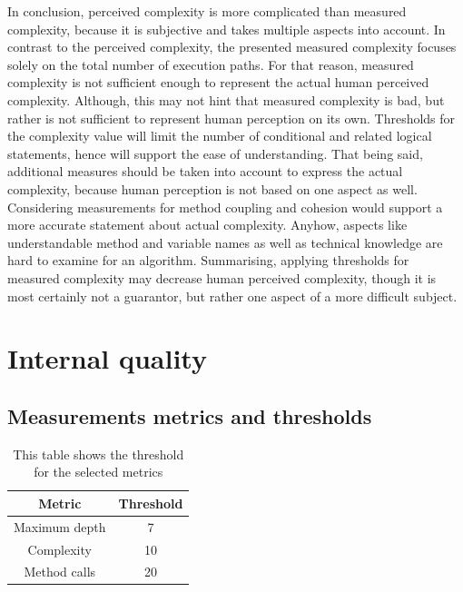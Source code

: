 \documentclass[conference]{IEEEtran}
\begin{document}
In conclusion, perceived complexity is more complicated than measured complexity, because it is subjective and takes multiple aspects into account. In contrast to the perceived complexity, the presented measured complexity focuses solely on the total number of execution paths. For that reason, measured complexity is not sufficient enough to represent the actual human perceived complexity. Although, this may not hint that measured complexity is bad, but rather is not sufficient to represent human perception on its own. Thresholds for the complexity value will limit the number of conditional and related logical statements, hence will support the ease of understanding. That being said, additional measures should be taken into account to express the actual complexity, because human perception is not based on one aspect as well. Considering measurements for method coupling and cohesion would support a more accurate statement about actual complexity. Anyhow, aspects like understandable method and variable names as well as technical knowledge are hard to examine for an algorithm. Summarising, applying thresholds for measured complexity may decrease human perceived complexity, though it is most certainly not a guarantor, but rather one aspect of a more difficult subject.

\section{Internal quality}

\subsection{Measurements metrics and thresholds}
\begin{table}
\centering
    \begin{tabular}{c c}
         Metric         & Threshold    \\ \hline
         Maximum depth  & 7             \\
         Complexity     & 10            \\
         Method calls   & 20            \\
    \end{tabular}
    \caption{This table shows the threshold for the selected metrics}
    \label{tbl:thresholds}
\end{table}
\end{document}
